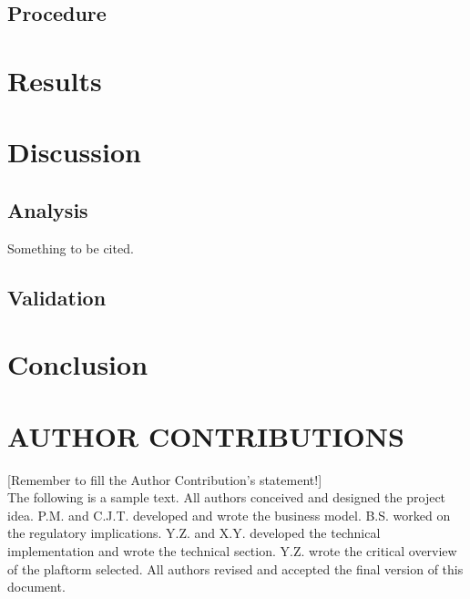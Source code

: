 \documentclass{Resources/bdlt-project}
\begin{document}
\subsection{Procedure}
\lipsum[6]

\section{Results}
\lipsum[7]

\section{Discussion}
\subsection{Analysis}
\lipsum[8]
Something to be cited.\cite{reference2}
\lipsum[2]

\subsection{Validation}
\lipsum[9]

\section{Conclusion}
\lipsum[10]

\section{AUTHOR CONTRIBUTIONS}
[Remember to fill the Author Contribution’s statement!] \\
The following is a sample text. All authors conceived and designed the project idea. P.M. and C.J.T. developed and wrote the business model. B.S. worked on the regulatory implications.  Y.Z. and X.Y. developed the technical implementation and wrote the technical section. Y.Z. wrote the critical overview of the plaftorm selected. All authors revised and accepted the final version of this document.

\printbibliography
\end{document}
